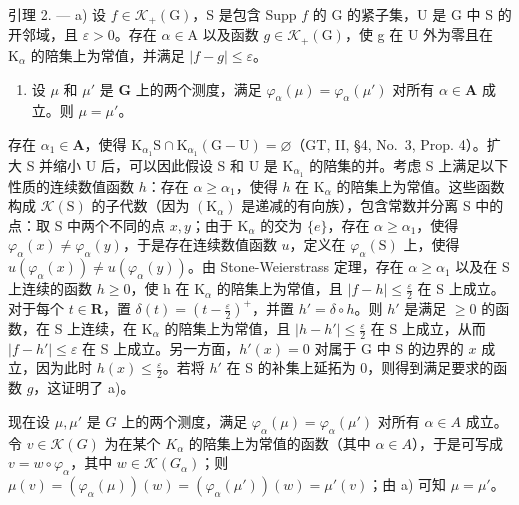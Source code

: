 引理 2. --- a) 设 \(f \in \mathcal{K}_{+}(\mathrm{G})\)，S 是包含 Supp \(f\) 的 G 的紧子集，U 是 G 中 S 的开邻域，且 \(\varepsilon > 0\)。存在 \(\alpha \in \mathrm{A}\) 以及函数 \(g \in \mathcal{K}_{+}(\mathrm{G})\)，使 g 在 U 外为零且在 \(\mathrm{K}_{\alpha}\) 的陪集上为常值，并满足 \(|f - g| \leqslant \varepsilon\)。

\begin{enumerate}
\def\labelenumi{\alph{enumi})}
\setcounter{enumi}{1}
\tightlist
\item
  设 \(\mu\) 和 \(\mu'\) 是 \(\mathbf{G}\) 上的两个测度，满足 \(\varphi_{\alpha}(\mu) = \varphi_{\alpha}(\mu')\) 对所有 \(\alpha \in \mathbf{A}\) 成立。则 \(\mu = \mu'\)。
\end{enumerate}

存在 \(\alpha_{1} \in \mathbf{A}\)，使得 \(\mathrm{K}_{\alpha_1}\mathrm{S} \cap \mathrm{K}_{\alpha_1}(\mathrm{G} - \mathrm{U}) = \varnothing\)（GT, II, §4, No.~3, Prop. 4）。扩大 S 并缩小 U 后，可以因此假设 S 和 U 是 \(\mathrm{K}_{\alpha_1}\) 的陪集的并。考虑 S 上满足以下性质的连续数值函数 \(h\)：存在 \(\alpha \geqslant \alpha_{1}\)，使得 \(h\) 在 \(\mathrm{K}_{\alpha}\) 的陪集上为常值。这些函数构成 \(\mathcal{K}(\mathrm{S})\) 的子代数（因为 \((\mathrm{K}_{\alpha})\) 是递减的有向族），包含常数并分离 S 中的点：取 S 中两个不同的点 \(x, y\)；由于 \(\mathrm{K}_{\alpha}\) 的交为 \(\{e\}\)，存在 \(\alpha \geqslant \alpha_{1}\)，使得 \(\varphi_{\alpha}(x) \neq \varphi_{\alpha}(y)\)，于是存在连续数值函数 \(u\)，定义在 \(\varphi_{\alpha}(\mathrm{S})\) 上，使得 \(u(\varphi_{\alpha}(x)) \neq u(\varphi_{\alpha}(y))\)。由 Stone-Weierstrass 定理，存在 \(\alpha \geqslant \alpha_{1}\) 以及在 S 上连续的函数 \(h \geqslant 0\)，使 h 在 \(\mathrm{K}_{\alpha}\) 的陪集上为常值，且 \(|f - h| \leqslant \frac{\varepsilon}{2}\) 在 S 上成立。对于每个 \(t \in \mathbf{R}\)，置 \(\delta(t) = \left(t - \frac{\varepsilon}{2}\right)^+\)，并置 \(h' = \delta \circ h\)。则 \(h'\) 是满足 \(\geqslant 0\) 的函数，在 S 上连续，在 \(\mathrm{K}_{\alpha}\) 的陪集上为常值，且 \(|h - h'| \leqslant \frac{\varepsilon}{2}\) 在 S 上成立，从而 \(|f - h'| \leqslant \varepsilon\) 在 S 上成立。另一方面，\(h'(x) = 0\) 对属于 G 中 S 的边界的 \(x\) 成立，因为此时 \(h(x) \leqslant \frac{\varepsilon}{2}\)。若将 \(h'\) 在 S 的补集上延拓为 0，则得到满足要求的函数 \(g\)，这证明了 a)。

现在设 \(\mu, \mu'\) 是 \(G\) 上的两个测度，满足 \(\varphi_{\alpha}(\mu) = \varphi_{\alpha}(\mu')\) 对所有 \(\alpha \in A\) 成立。令 \(v \in \mathcal{K}(G)\) 为在某个 \(K_{\alpha}\) 的陪集上为常值的函数（其中 \(\alpha \in A\)），于是可写成 \(v = w \circ \varphi_{\alpha}\)，其中 \(w \in \mathcal{K}(G_{\alpha})\)；则 \(\mu(v) = (\varphi_{\alpha}(\mu))(w) = (\varphi_{\alpha}(\mu'))(w) = \mu'(v)\)；由 a) 可知 \(\mu = \mu'\)。

